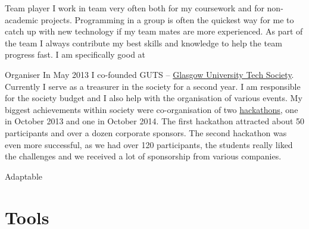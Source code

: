 \documentclass{tccv}
\begin{document}
\begin{skillist}
\item{Team player} {I work in team very often both for my coursework and for non-academic projects. Programming in a group is often the quickest way for me to catch up with new technology if my team mates are more experienced. As part of the team I always contribute my best skills and knowledge to help the team progress fast. I am specifically good at} %


\item{Organiser} {In May 2013 I co-founded GUTS -- \href{http://gutechsoc.com}{Glasgow University Tech Society}. Currently I serve as a treasurer in the society for a second year. I am responsible for the society budget and I also help with the organisation of various events. My biggest achievements within society were co-organisation of two \href{http://storify.com/Eventhread/gu-hackaton}{hackathons}, one in October 2013 and one in October 2014. The first hackathon attracted about 50 participants and over a dozen corporate sponsors. The second hackathon was even more successful, as we had over 120 participants, the students really liked the challenges and we received a lot of sponsorship from various companies.}

\item{Adaptable} {}

\end{skillist}
\newpage
\section{\LARGE Tools \normalsize}
\end{document}
